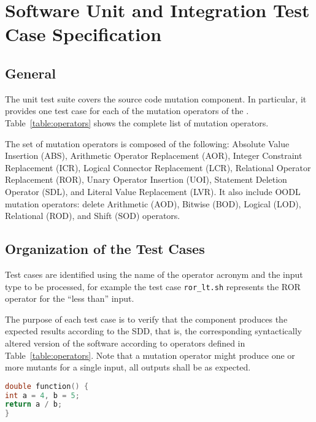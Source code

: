 
\chapter{Software Unit and Integration Test Case Specification}
\label{chap:spec}

\section{General}

The \FAQAS unit test suite covers the source code mutation component. In particular, it provides one test case for each of the mutation operators of the \FAQAS. Table~\ref{table:operators} shows the complete list of mutation operators.

The set of \FAQAS mutation operators is composed of the following: Absolute Value Insertion (ABS), Arithmetic Operator Replacement (AOR), Integer Constraint Replacement (ICR), Logical Connector Replacement (LCR), Relational Operator Replacement (ROR), Unary Operator Insertion (UOI), Statement Deletion Operator (SDL), and Literal Value Replacement (LVR).
It also include OODL mutation operators: delete Arithmetic (AOD), Bitwise (BOD), Logical (LOD), Relational (ROD), and Shift (SOD) operators.




\section{Organization of the Test Cases}

Test cases are identified using the name of the operator acronym and the input type to be processed, for example the test case \texttt{ror\_lt.sh} represents the ROR operator for the ``less than'' input.

The purpose of each test case is to verify that the component produces the expected results according to the SDD, that is, the corresponding syntactically altered version of the software according to operators defined in Table~\ref{table:operators}. 
Note that a mutation operator might produce one or more mutants for a single input, all outputs shall be as expected.

\begin{lstlisting}[language=C, label=test_source, caption=C function example.]
double function() {
int a = 4, b = 5;
return a / b;
}
\end{lstlisting}

